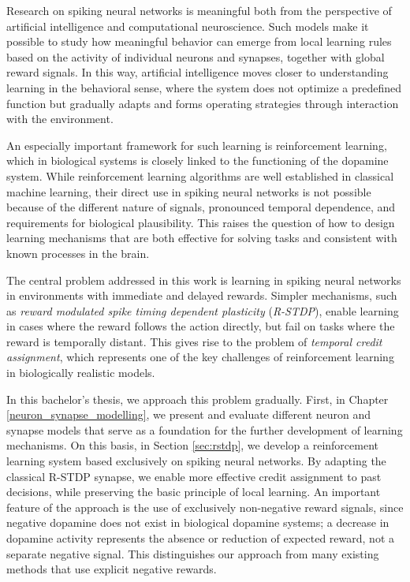 \documentclass[a4paper,12pt,openright]{book}
\begin{document}
Research on spiking neural networks is meaningful both from the perspective of artificial intelligence and computational neuroscience. Such models make it possible to study how meaningful behavior can emerge from local learning rules based on the activity of individual neurons and synapses, together with global reward signals. In this way, artificial intelligence moves closer to understanding learning in the behavioral sense, where the system does not optimize a predefined function but gradually adapts and forms operating strategies through interaction with the environment.

An especially important framework for such learning is reinforcement learning, which in biological systems is closely linked to the functioning of the dopamine system. While reinforcement learning algorithms are well established in classical machine learning, their direct use in spiking neural networks is not possible because of the different nature of signals, pronounced temporal dependence, and requirements for biological plausibility. This raises the question of how to design learning mechanisms that are both effective for solving tasks and consistent with known processes in the brain.

The central problem addressed in this work is learning in spiking neural networks in environments with immediate and delayed rewards. Simpler mechanisms, such as \textit{reward modulated spike timing dependent plasticity} (\textit{R-STDP}), enable learning in cases where the reward follows the action directly, but fail on tasks where the reward is temporally distant. This gives rise to the problem of \textit{temporal credit assignment}, which represents one of the key challenges of reinforcement learning in biologically realistic models.

In this bachelor's thesis, we approach this problem gradually. First, in Chapter \ref{neuron_synapse_modelling}, we present and evaluate different neuron and synapse models that serve as a foundation for the further development of learning mechanisms. On this basis, in Section \ref{sec:rstdp}, we develop a reinforcement learning system based exclusively on spiking neural networks. By adapting the classical R-STDP synapse, we enable more effective credit assignment to past decisions, while preserving the basic principle of local learning. An important feature of the approach is the use of exclusively non-negative reward signals, since negative dopamine does not exist in biological dopamine systems; a decrease in dopamine activity represents the absence or reduction of expected reward, not a separate negative signal. This distinguishes our approach from many existing methods that use explicit negative rewards.
\end{document}
